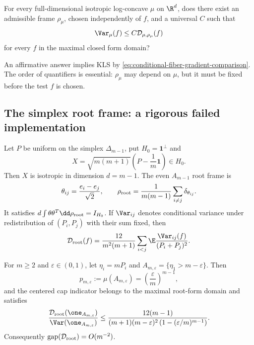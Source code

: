 \documentclass[../../main.tex]{subfiles}
\begin{document}
\begin{question}
\label{q:conditional-fiber-frame}
For every full-dimensional isotropic log-concave $\mu$ on $\R^d$, does there exist an admissible
frame $\rho_\mu$, chosen independently of $f$, and a universal $C$ such that
\begin{equation}\label{eq:conditional-fiber-gap}
  \Var_\mu(f)\le C\mathcal D_{\mu,\rho_\mu}(f)
\end{equation}
for every $f$ in the maximal closed form domain?
\end{question}

An affirmative answer implies KLS by
\eqref{eq:conditional-fiber-gradient-comparison}. The order of quantifiers is essential:
$\rho_\mu$ may depend on $\mu$, but it must be fixed before the test $f$ is chosen.

\subsection{The simplex root frame: a rigorous failed implementation}
\label{subsec:fiber-root-failure}

Let $P$ be uniform on the simplex $\Delta_{m-1}$, put $H_0=\mathbf1^\perp$ and
\[
  X=\sqrt{m(m+1)}\left(P-\frac1m\mathbf1\right)\in H_0.
\]
Then $X$ is isotropic in dimension $d=m-1$. The even $A_{m-1}$ root frame is
\[
  \theta_{ij}=\frac{e_i-e_j}{\sqrt2},
  \qquad
  \rho_{\rm root}=\frac1{m(m-1)}\sum_{i\ne j}\delta_{\theta_{ij}}.
\]
It satisfies
$d\int\theta\theta^T\dd\rho_{\rm root}=I_{H_0}$. If $\Var_{ij}$ denotes conditional
variance under redistribution of $(P_i,P_j)$ with their sum fixed, then
\begin{equation}\label{eq:conditional-root-form}
  \mathcal D_{\rm root}(f)
  =\frac{12}{m^2(m+1)}\sum_{i<j}
    \E\frac{\Var_{ij}(f)}{(P_i+P_j)^2}.
\end{equation}

\begin{proposition}
\label{prop:conditional-fiber-root-obstruction}
For $m\ge2$ and $\varepsilon\in(0,1)$, let $\eta_i=mP_i$ and
$A_{m,\varepsilon}=\{\eta_1>m-\varepsilon\}$. Then
\[
  p_{m,\varepsilon}:=\mu(A_{m,\varepsilon})
  =\left(\frac\varepsilon m\right)^{m-1},
\]
and the centered cap indicator belongs to the maximal root-form domain and satisfies
\begin{equation}\label{eq:conditional-root-cap}
  \frac{\mathcal D_{\rm root}(\one_{A_{m,\varepsilon}})}
       {\Var(\one_{A_{m,\varepsilon}})}
  \le
  \frac{12(m-1)}{(m+1)(m-\varepsilon)^2
  \left(1-(\varepsilon/m)^{m-1}\right)}.
\end{equation}
Consequently $\operatorname{gap}(\mathcal D_{\rm root})=O(m^{-2})$.
\end{proposition}
\end{document}
